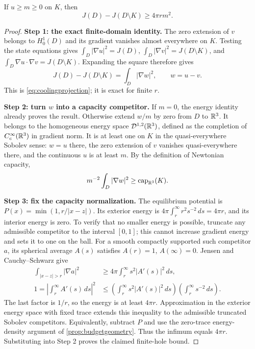 \begin{lemma}
\label{lem:floorcapacity}
If $u\ge m\ge0$ on $K$, then
\begin{equation}
 J(D)-J(D\setminus K)\ge4\pi r m^2.
 \label{eq:floorcapacity}
\end{equation}
\end{lemma}
\begin{proof}
\textbf{Step 1: the exact finite-domain identity.}
The zero extension of $v$ belongs to $H_0^1(D)$ and its gradient vanishes
almost everywhere on $K$. Testing the state equations gives
$\int_D|\nabla u|^2=J(D)$,
$\int_D|\nabla v|^2=J(D\setminus K)$, and
$\int_D\nabla u\cdot\nabla v=J(D\setminus K)$.
Expanding the square therefore gives
\[
 J(D)-J(D\setminus K)=\int_D|\nabla w|^2,\qquad w=u-v.
\]
This is \cref{eq:coolingprojection}; it is exact for finite $r$.

\textbf{Step 2: turn $w$ into a capacity competitor.}
If $m=0$, the energy identity already proves the result. Otherwise extend
$w/m$ by zero from $D$ to $\mathbb{R}^3$. It belongs to the homogeneous energy space
$\mathcal D^{1,2}(\mathbb{R}^3)$, defined as the completion of
$C_c^\infty(\mathbb{R}^3)$ in gradient norm. It is at least one on $K$ in the
quasi-everywhere Sobolev sense: $w=u$ there, the zero extension of $v$
vanishes quasi-everywhere there, and the continuous $u$ is at least $m$.
By the definition of Newtonian capacity,
\[
 m^{-2}\int_D|\nabla w|^2\ge\operatorname{cap}_{\mathbb{R}^3}(K).
\]

\textbf{Step 3: fix the capacity normalization.}
The equilibrium potential is $P(x)=\min(1,r/|x-z|)$. Its exterior energy is
$4\pi\int_r^\infty r^2s^{-2}\,ds=4\pi r$, and its interior energy is
zero. To verify that no smaller energy is possible, truncate any admissible
competitor to the interval $[0,1]$; this cannot increase gradient energy and
sets it to one on the ball. For a smooth compactly supported such competitor
$a$, its spherical average $A(s)$ satisfies $A(r)=1$, $A(\infty)=0$.
Jensen and Cauchy--Schwarz give
\begin{align*}
 \int_{|x-z|>r}|\nabla a|^2
 &\ge4\pi\int_r^\infty s^2|A'(s)|^2\,ds,\\
 1=\left|\int_r^\infty A'(s)\,ds\right|^2
 &\le\left(\int_r^\infty s^2|A'(s)|^2\,ds\right)
       \left(\int_r^\infty s^{-2}\,ds\right).
\end{align*}
The last factor is $1/r$, so the energy is at least $4\pi r$.
Approximation in the exterior energy space with fixed trace extends this
inequality to the admissible truncated Sobolev competitors. Equivalently,
subtract $P$ and use the zero-trace energy-density argument of
\cref{prop:budgetgeometry}. Thus the infimum equals $4\pi r$.
Substituting into Step 2 proves the claimed finite-hole bound.
\end{proof}

